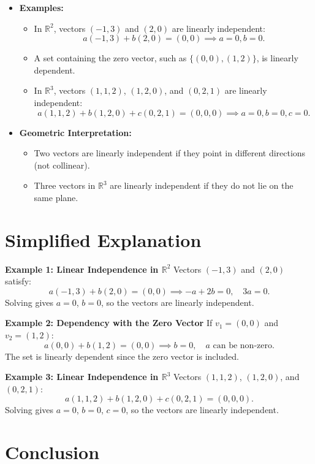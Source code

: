 \documentclass{article}
\begin{document}
\begin{itemize}
  \item \textbf{Examples:}
    \begin{itemize}
      \item In $\mathbb{R}^2$, vectors $(-1, 3)$ and $(2, 0)$ are linearly independent:
        \[
          a(-1, 3) + b(2, 0) = (0, 0) \implies a = 0, b = 0.
        \]
      \item A set containing the zero vector, such as $\{(0, 0), (1, 2)\}$, is linearly dependent.
      \item In $\mathbb{R}^3$, vectors $(1, 1, 2)$, $(1, 2, 0)$, and $(0, 2, 1)$ are linearly independent:
        \[
          a(1, 1, 2) + b(1, 2, 0) + c(0, 2, 1) = (0, 0, 0) \implies a = 0, b = 0, c = 0.
        \]
    \end{itemize}

  \item \textbf{Geometric Interpretation:}
    \begin{itemize}
      \item Two vectors are linearly independent if they point in different directions (not collinear).
      \item Three vectors in $\mathbb{R}^3$ are linearly independent if they do not lie on the same plane.
    \end{itemize}
\end{itemize}

\section*{Simplified Explanation}

\textbf{Example 1: Linear Independence in $\mathbb{R}^2$}
Vectors $(-1, 3)$ and $(2, 0)$ satisfy:
\[
  a(-1, 3) + b(2, 0) = (0, 0) \implies -a + 2b = 0, \quad 3a = 0.
\]
Solving gives $a = 0$, $b = 0$, so the vectors are linearly independent.

\textbf{Example 2: Dependency with the Zero Vector}
If $v_1 = (0, 0)$ and $v_2 = (1, 2)$:
\[
  a(0, 0) + b(1, 2) = (0, 0) \implies b = 0, \quad a \text{ can be non-zero}.
\]
The set is linearly dependent since the zero vector is included.

\textbf{Example 3: Linear Independence in $\mathbb{R}^3$}
Vectors $(1, 1, 2)$, $(1, 2, 0)$, and $(0, 2, 1)$:
\[
  a(1, 1, 2) + b(1, 2, 0) + c(0, 2, 1) = (0, 0, 0).
\]
Solving gives $a = 0$, $b = 0$, $c = 0$, so the vectors are linearly independent.

\section*{Conclusion}
\end{document}
